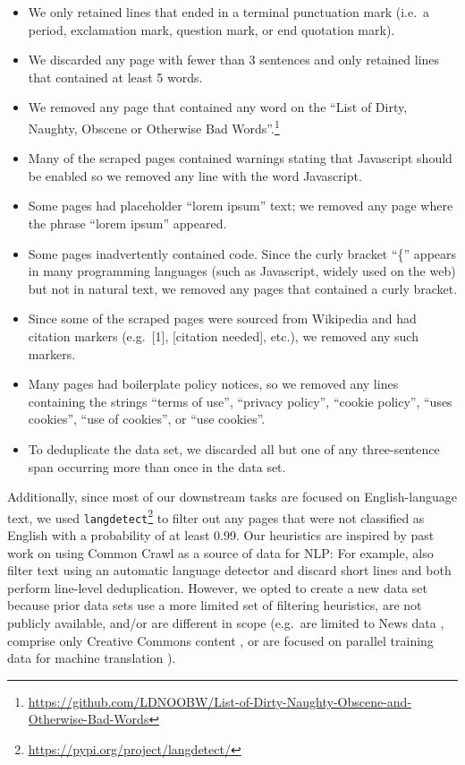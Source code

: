 \begin{itemize}
  \item We only retained lines that ended in a terminal punctuation mark (i.e.\ a period, exclamation mark, question mark, or end quotation mark).
  \item We discarded any page with fewer than 3 sentences and only retained lines that contained at least 5 words.
  \item We removed any page that contained any word on the ``List of Dirty, Naughty, Obscene or Otherwise Bad Words''.\footnote{\url{https://github.com/LDNOOBW/List-of-Dirty-Naughty-Obscene-and-Otherwise-Bad-Words}}
  \item Many of the scraped pages contained warnings stating that Javascript should be enabled so we removed any line with the word Javascript.
  \item Some pages had placeholder ``lorem ipsum'' text; we removed any page where the phrase ``lorem ipsum'' appeared.
  \item Some pages inadvertently contained code. Since the curly bracket ``\{'' appears in many programming languages (such as Javascript, widely used on the web) but not in natural text, we removed any pages that contained a curly bracket.
  \item Since some of the scraped pages were sourced from Wikipedia and had citation markers (e.g.\ [1], [citation needed], etc.), we removed any such markers.
  \item Many pages had boilerplate policy notices, so we removed any lines containing the strings ``terms of use'', ``privacy policy'', ``cookie policy'', ``uses cookies'', ``use of cookies'', or ``use cookies''.
  \item To deduplicate the data set, we discarded all but one of any three-sentence span occurring more than once in the data set.
\end{itemize}

Additionally, since most of our downstream tasks are focused on English-language text, we used \texttt{langdetect}\footnote{\url{https://pypi.org/project/langdetect/}} to filter out any pages that were not classified as English with a probability of at least 0.99. Our heuristics are inspired by past work on using Common Crawl as a source of data for NLP: For example, \citet{grave2018learning} also filter text using an automatic language detector and discard short lines and \citet{smith2013dirt,grave2018learning} both perform line-level deduplication. However, we opted to create a new data set because prior data sets use a more limited set of filtering heuristics, are not publicly available, and/or are different in scope (e.g.\ are limited to News data \citep{zellers2019defending,liu2019roberta}, comprise only Creative Commons content \citep{habernal2016c4corpus}, or are focused on parallel training data for machine translation \citep{smith2013dirt}).

